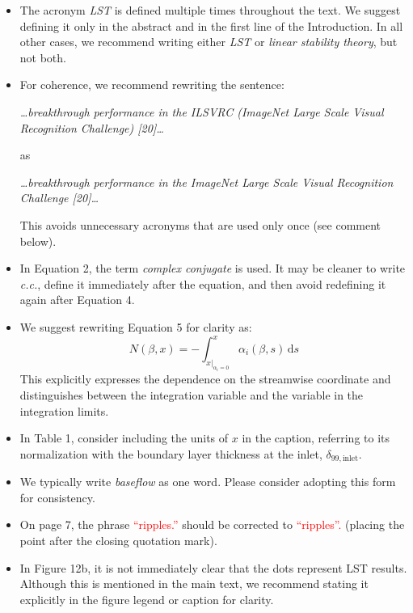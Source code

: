 \documentclass[11pt]{article}
\begin{document}
\begin{itemize}
  \item The acronym \textit{LST} is defined multiple times throughout the text. We suggest defining it only in the abstract and in the first line of the Introduction. In all other cases, we recommend writing either \textit{LST} or \textit{linear stability theory}, but not both.
  
  \item For coherence, we recommend rewriting the sentence:

    \textit{\ldots breakthrough performance in the ILSVRC (ImageNet Large Scale Visual Recognition Challenge) [20]\ldots}  

    as  
    
    \textit{\ldots breakthrough performance in the ImageNet Large Scale Visual Recognition Challenge [20]\ldots}  
    
    This avoids unnecessary acronyms that are used only once (see comment below).
  
  \item In Equation 2, the term \textit{complex conjugate} is used. It may be cleaner to write \textit{c.c.}, define it immediately after the equation, and then avoid redefining it again after Equation 4.
  
  \item We suggest rewriting Equation 5 for clarity as:
    $$
      N(\beta, x) = -\int_{x|_{\alpha_i=0}}^x \alpha_i(\beta, s)\,\mathrm{d}s
    $$
    This explicitly expresses the dependence on the streamwise coordinate and distinguishes between the integration variable and the variable in the integration limits.

  \item In Table 1, consider including the units of $x$ in the caption, referring to its normalization with the boundary layer thickness at the inlet, $\delta_{99,\text{inlet}}$.

  \item We typically write \textit{baseflow} as one word. Please consider adopting this form for consistency.

  \item On page 7, the phrase \textcolor{red}{``ripples.''} should be corrected to \textcolor{red}{``ripples''.} (placing the point after the closing quotation mark).

  \item In Figure 12b, it is not immediately clear that the dots represent LST results. Although this is mentioned in the main text, we recommend stating it explicitly in the figure legend or caption for clarity.


\end{itemize}
\end{document}
